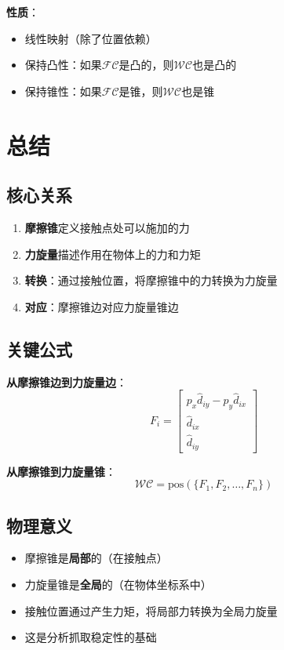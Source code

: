 \documentclass[12pt,a4paper]{article}
\begin{document}
\textbf{性质}：
\begin{itemize}
\item 线性映射（除了位置依赖）
\item 保持凸性：如果$\mathcal{FC}$是凸的，则$\mathcal{WC}$也是凸的
\item 保持锥性：如果$\mathcal{FC}$是锥，则$\mathcal{WC}$也是锥
\end{itemize}

\section{总结}

\subsection{核心关系}

\begin{enumerate}
\item \textbf{摩擦锥}定义接触点处可以施加的力
\item \textbf{力旋量}描述作用在物体上的力和力矩
\item \textbf{转换}：通过接触位置，将摩擦锥中的力转换为力旋量
\item \textbf{对应}：摩擦锥边对应力旋量锥边
\end{enumerate}

\subsection{关键公式}

\textbf{从摩擦锥边到力旋量边}：
\begin{equation}
F_i = \begin{bmatrix} p_x \hat{d}_{iy} - p_y \hat{d}_{ix} \\ \hat{d}_{ix} \\ \hat{d}_{iy} \end{bmatrix}
\end{equation}

\textbf{从摩擦锥到力旋量锥}：
\begin{equation}
\mathcal{WC} = \text{pos}(\{F_1, F_2, \ldots, F_n\})
\end{equation}

\subsection{物理意义}

\begin{itemize}
\item 摩擦锥是\textbf{局部}的（在接触点）
\item 力旋量锥是\textbf{全局}的（在物体坐标系中）
\item 接触位置通过产生力矩，将局部力转换为全局力旋量
\item 这是分析抓取稳定性的基础
\end{itemize}
\end{document}
